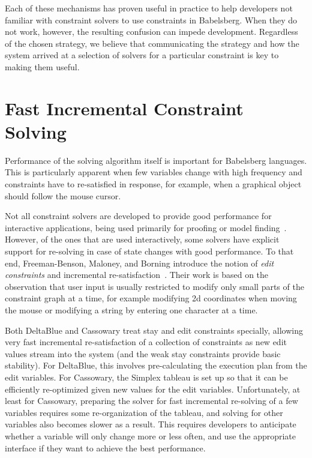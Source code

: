 \documentclass[numbers]{sigplanconf}
\begin{document}
Each of these mechanisms has proven useful in practice to help developers not
familiar with constraint solvers to use constraints in Babelsberg. When they do
not work, however, the resulting confusion can impede development. Regardless of
the chosen strategy, we believe that communicating the strategy and how the
system arrived at a selection of solvers for a particular constraint is key to
making them useful.

\section{Fast Incremental Constraint Solving}
\label{sec:implementing-edit-constraints}
Performance of the solving algorithm itself is important for Babelsberg
languages. This is particularly apparent when few variables change with high
frequency and constraints have to re-satisfied in response, for example, when a
graphical object should follow the mouse cursor.

Not all constraint solvers are developed to provide good performance for
interactive applications, being used primarily for proofing or model
finding~\cite{de2008z3}. However, of the ones that are used interactively, some
solvers have explicit support for re-solving in case of state changes with good
performance. To that end, Freeman-Benson, Maloney, and Borning introduce the
notion of \emph{edit constraints} and incremental
re-satisfaction~\cite{freeman1990incremental}.  Their work is based on the
observation that user input is usually restricted to modify only small parts of
the constraint graph at a time, for example modifying 2d coordinates when moving
the mouse or modifying a string by entering one character at a time.

Both DeltaBlue and Cassowary treat stay and edit constraints specially, allowing
very fast incremental re-satisfaction of a collection of constraints as new edit
values stream into the system (and the weak stay constraints provide basic
stability). For DeltaBlue, this involves pre-calculating the execution plan from
the edit variables. For Cassowary, the Simplex tableau is set up so that it can
be efficiently re-optimized given new values for the edit
variables. Unfortunately, at least for Cassowary, preparing the solver for fast
incremental re-solving of a few variables requires some re-organization of the
tableau, and solving for other variables also becomes slower as a result. This
requires developers to anticipate whether a variable will only change more or
less often, and use the appropriate interface if they want to achieve the best
performance.
\end{document}
